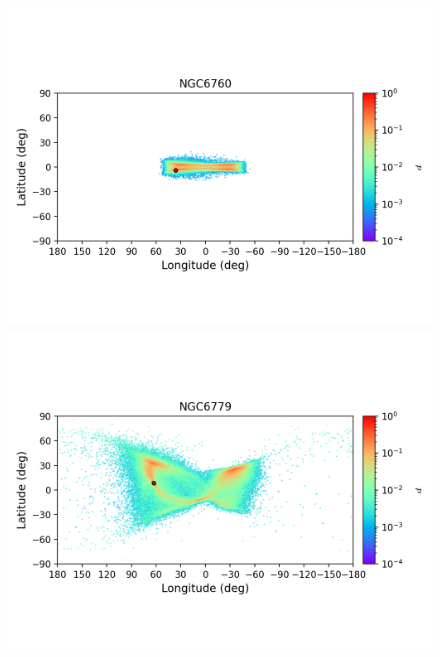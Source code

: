 \begin{figure}
\begin{center}
                \includegraphics[clip=true, trim = 0mm 20mm 0mm 10mm, width=1\columnwidth]{images/error_plots_NGC6760.png}
                \includegraphics[clip=true, trim = 0mm 20mm 0mm 10mm, width=1\columnwidth]{images/error_plots_NGC6779.png}
                

\end{center}
\end{figure}
